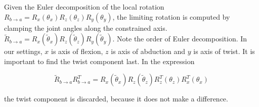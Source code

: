 \documentclass[tog]{acmsiggraph}
\begin{document}
Given the Euler decomposition of the local rotation  $R_{b\rightarrow a} = R_x(\theta_x) R_z(\theta_z) R_y(\theta_y)$, the limiting rotation is computed by clamping the joint angles along the constrained axis.  $\tilde{R}_{b\rightarrow a} = R_x(\tilde{\theta}_x) R_z(\tilde{\theta}_z) R_y(\tilde{\theta}_y)$. Note the order of Euler decomposition. In our settings, $x$ is axis of flexion, $z$ is axis of abduction and $y$ is axis of twist. It is important to find the twist component last. In the expression 

\begin{equation}
\tilde{R}_{b\rightarrow a} R^T_{b\rightarrow a} =  R_x(\tilde{\theta}_x) R_z(\tilde{\theta}_z) R^T_z(\theta_z) R^T_x(\theta_x)
\end{equation}

the twist component is discarded, because it does not make a difference.



 

\end{document}
